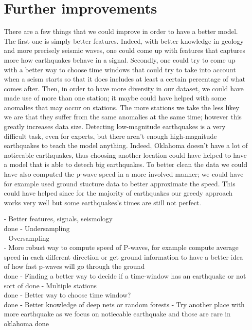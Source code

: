 \documentclass[10pt,conference,compsocconf]{IEEEtran}
\begin{document}
\section{Further improvements}
There are a few things that we could improve in order to have a better model. The first one is simply better features. Indeed, with better knowledge in geology and more precisely seismic waves, one could come up with features that captures more how earthquakes behave in a signal. Secondly, one could try to come up with a better way to choose time windows that could try to take into account when a seism starts so that it does includes at least a certain percentage of what comes after. Then, in order to have more diversity in our dataset, we could have made use of more than one station; it maybe could have helped with some anomalies that may occur on stations. The more stations we take the less likey we are that they suffer from the same anomalies at the same time; however this greatly increases data size. Detecting low-magnitude earthquakes is a very difficult task, even for experts, but there aren't enough high-magnitude earthquakes to teach the model anything. Indeed, Oklahoma doesn't have a lot of noticeable earthquakes, thus choosing another location could have helped to have a model that is able to detech big earthquakes. To better clean the data we could have also computed the p-wave speed in a more involved manner; we could have for example used ground stucture data to better approximate the speed. This could have helped since for the majority of earthquakes our greedy approach works very well but some earthquakes's times are still not perfect.

- Better features, signals, seismology\\ done 
- Undersampling\\
- Oversampling\\
- More robust way to compute speed of P-waves, for example compute average speed in each different direction or get ground information to have a better idea of how fast p-waves will go through the ground\\ done
- Finding a better way to decide if a time-window has an earthquake or not\\ sort of done
- Multiple stations\\ done
- Better way to choose time window?\\ done
- Better knowledge of deep nets or random forests
- Try another place with more earthquake as we focus on notiecable earthquake and those are rare in oklahoma done
\end{document}
